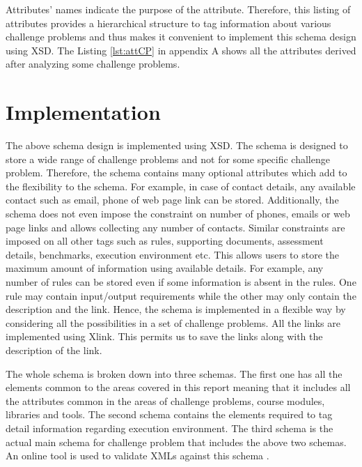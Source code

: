 \documentclass[11pt,letterpaper]{report}
\begin{document}
Attributes' names indicate the purpose of the attribute. Therefore, this listing of attributes provides a hierarchical structure to tag information about various challenge problems and thus makes it convenient to implement this schema design using XSD. The Listing \ref{lst:attCP} in appendix A shows all the attributes derived after analyzing some challenge problems.

\section{Implementation}
The above schema design is implemented using XSD. The schema is designed to store a wide range of challenge problems and not for some specific challenge problem. Therefore, the schema contains many optional attributes which add to the flexibility to the schema. For example, in case of contact details, any available contact such as email, phone of web page link can be stored. Additionally, the schema does not even impose the constraint on number of phones, emails or web page links and allows collecting any number of contacts. Similar constraints are imposed on all other tags such as rules, supporting documents, assessment details, benchmarks, execution environment etc. This allows users to store the  maximum amount of information using available details. For example, any number of rules can be stored even if some information is absent in the rules. One rule may contain input/output requirements while the other may only contain the description and the link. Hence, the schema is implemented in a flexible way by considering all the possibilities in a set of challenge problems. All the links are implemented using Xlink. This permits us to save the links along with the description of the link.    

The whole schema is broken down into three schemas. The first one has all the elements common to the areas covered in this report meaning that it includes all the attributes common in the areas of challenge problems, course modules, libraries and tools. The second schema contains the elements required to tag detail information regarding execution environment. The third schema is the actual main schema for challenge problem that includes the above two schemas. An online tool is used to validate XMLs against this schema \cite{olXSD}.
\end{document}
